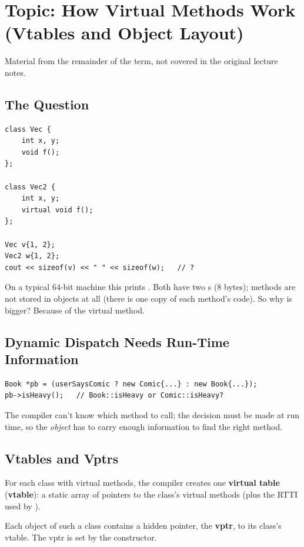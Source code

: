 \chapter{Topic: How Virtual Methods Work (Vtables and Object Layout)}

\begin{aside}
Material from the remainder of the term, not covered in the original lecture
notes.
\end{aside}

\section{The Question}
\begin{lstlisting}[style=cpp]
class Vec {
    int x, y;
    void f();
};

class Vec2 {
    int x, y;
    virtual void f();
};

Vec v{1, 2};
Vec2 w{1, 2};
cout << sizeof(v) << " " << sizeof(w);   // ?
\end{lstlisting}
On a typical 64-bit machine this prints . Both have two s
(8 bytes); methods are not stored in objects at all (there is one copy of each
method's code). So why is  bigger? Because of the virtual method.

\section{Dynamic Dispatch Needs Run-Time Information}
\begin{lstlisting}[style=cpp]
Book *pb = (userSaysComic ? new Comic{...} : new Book{...});
pb->isHeavy();   // Book::isHeavy or Comic::isHeavy?
\end{lstlisting}
The compiler can't know which method to call; the decision must be made at run
time, so the \emph{object} has to carry enough information to find the right
method.

\section{Vtables and Vptrs}
For each class with virtual methods, the compiler creates one \textbf{virtual
table} (\textbf{vtable}): a static array of pointers to the class's virtual
methods (plus the RTTI used by ).

Each object of such a class contains a hidden pointer, the \textbf{vptr}, to its
class's vtable. The vptr is set by the constructor.


